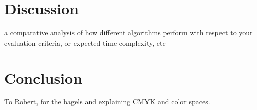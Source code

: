 \documentclass[acmlarge]{acmart}
\begin{document}
\section{Discussion}

a comparative analysis of how different algorithms perform with respect to your evaluation
criteria, or expected time complexity, etc


\section{Conclusion}

\begin{acks}
To Robert, for the bagels and explaining CMYK and color spaces.
\end{acks}



\end{document}
